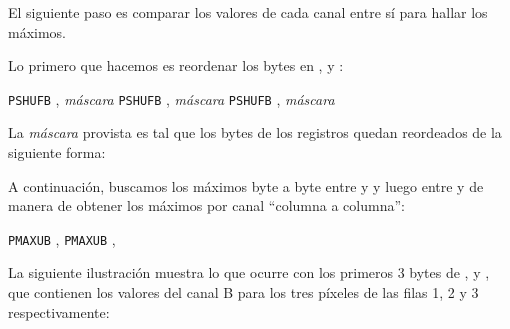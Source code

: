 El siguiente paso es comparar los valores de cada canal entre sí para hallar los máximos.

Lo primero que hacemos es reordenar los bytes en ,  y :

\begin{pseudocodigo}
    \STATE \texttt{PSHUFB} , \textit{máscara}
    \STATE \texttt{PSHUFB} , \textit{máscara}
    \STATE \texttt{PSHUFB} , \textit{máscara}
\end{pseudocodigo}

La \textit{máscara} provista es tal que los bytes de los registros quedan
reordeados de la siguiente forma:

\begin{center}
\end{center}

A continuación, buscamos los máximos byte a byte entre  y  y luego entre
 y  de manera de obtener los máximos por canal ``columna a columna'':

\begin{pseudocodigo}
    \STATE \texttt{PMAXUB} , 
    \STATE \texttt{PMAXUB} ,     
\end{pseudocodigo}

La siguiente ilustración muestra lo que ocurre con los primeros 3 bytes de
,  y , que contienen los valores del canal B para los
tres píxeles de las filas 1, 2 y 3 respectivamente:

\begin{center}
\end{center}

